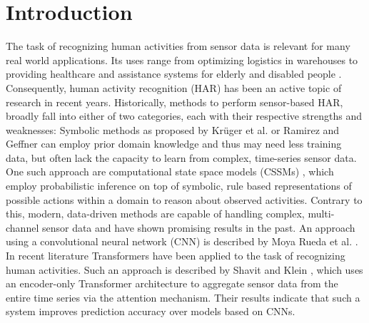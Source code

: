\documentclass[11pt,titlepage,oneside,openany]{book}
\begin{document}
\tableofcontents
\newpage



\listoffigures

\listoftables

\newpage


\chapter{Introduction}
\label{cha:intro}
The task of recognizing human activities from sensor data is relevant for many real world applications. Its uses range from optimizing logistics in warehouses to providing healthcare and assistance systems for elderly and disabled people \cite{ludtke_human_2021, chen_sensor-based_2012}. Consequently, human activity recognition (HAR) has been an active topic of research in recent years. Historically, methods to perform sensor-based HAR, broadly fall into either of two categories, each with their respective strengths and weaknesses: Symbolic methods as proposed by Kr\"uger et al. or Ramirez and Geffner \cite{kruger_computational_2014, ramirez_goal_2011} can employ prior domain knowledge and thus may need less training data, but often lack the capacity to learn from complex, time-series sensor data. One such approach are computational state space models (CSSMs) \cite{kruger_computational_2014}, which employ probabilistic inference on top of symbolic, rule based representations of possible actions within a domain to reason about observed activities. Contrary to this, modern, data-driven methods are capable of handling complex, multi-channel sensor data and have shown promising results in the past. An approach using a convolutional neural network (CNN) is described by Moya Rueda et al. \cite{moya_rueda_convolutional_2018}. In recent literature Transformers have been applied to the task of recognizing human activities. Such an approach is described by Shavit and Klein \cite{shavit_boosting_2021}, which uses an encoder-only Transformer architecture to aggregate sensor data from the entire time series via the attention mechanism. Their results indicate that such a system improves prediction accuracy over models based on CNNs.
\end{document}
